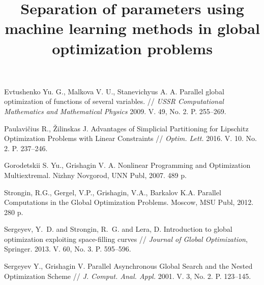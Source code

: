 \documentclass[11pt, oneside, a4paper]{article}
\begin{document}
\newpage

\title{Separation of parameters using machine learning methods in global optimization problems}




\begin{biblioen}

 Evtushenko Yu. G., Malkova V. U., Stanevichyus A. A. Parallel global optimization of functions of several variables. // {\it USSR Computational Mathematics and Mathematical Physics} 2009. V. 49, No. 2. P. 255--269.

 Paulavi{\v c}ius R., {\v Z}ilinskas J. Advantages of Simplicial Partitioning for Lipschitz Optimization Problems with Linear Constraints // {\it Optim. Lett.} 2016. V. 10. No. 2. P. 237--246.

 Gorodetskii S. Yu., Grishagin V. A. Nonlinear Programming and Optimization Multiextremal. Nizhny Novgorod, UNN Publ, 2007. 489 p.

 Strongin, R.G., Gergel, V.P., Grishagin, V.A., Barkalov K.A. Parallel Computations in the Global Optimization Problems. Moscow, MSU Publ, 2012. 280 p.

 Sergeyev, Y.~D. and Strongin, R.~G. and Lera, D. Introduction to global optimization exploiting space-filling curves // {\it Journal of Global Optimization}, Springer. 2013. V. 60, No. 3. P. 595--596.

 Sergeyev Y., Grishagin V. Parallel Asynchronous Global Search and the Nested Optimization Scheme // {\it J. Comput. Anal. Appl.} 2001. V. 3, No. 2. P. 123--145.

\end{biblioen}
\end{document}

